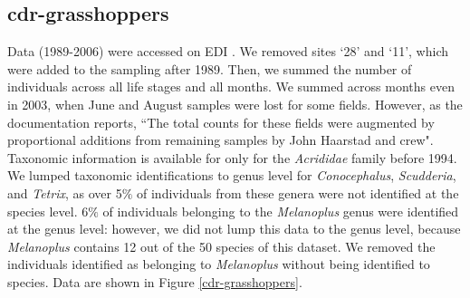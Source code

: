 \documentclass[11pt, oneside]{article}
\begin{document}
\subsection{cdr-grasshoppers}
Data (1989-2006) were accessed on EDI \citep{cdr-grasshoppers}.
We removed sites `28' and `11', which were added to the sampling after 1989. 
Then, we summed the number of individuals across all life stages and all months. 
We summed across months even in 2003, when June and August samples were lost for some fields. 
However, as the documentation reports, ``The total counts for these fields were augmented by proportional additions from remaining samples by John Haarstad and crew".
Taxonomic information is available for only for the {\it Acrididae} family before 1994. 
We lumped taxonomic identifications to genus level for {\it Conocephalus}, {\it Scudderia}, and {\it Tetrix}, as over 5$\%$ of individuals from these genera were not identified at the species level. 
6$\%$ of individuals belonging to the {\it Melanoplus} genus were identified at the genus level: however, we did not lump this data to the genus level, because {\it Melanoplus} contains 12 out of the 50 species of this dataset. We removed the individuals identified as belonging to {\it Melanoplus} without being identified to species. 
Data are shown in Figure \ref{cdr-grasshoppers}.
\end{document}
